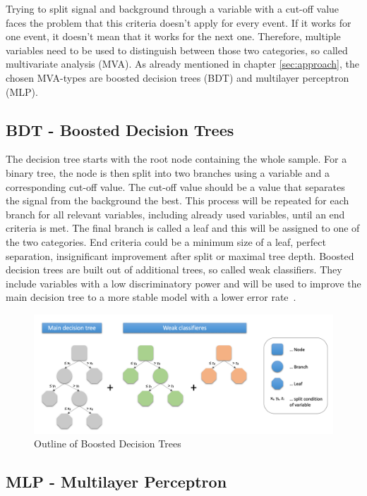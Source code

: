 \documentclass[11pt]{scrartcl}
\begin{document}
Trying to split signal and background through a variable with a cut-off value faces the problem that this criteria doesn't apply for every event. If it works for one event, it doesn't mean that it works for the next one. Therefore, multiple variables need to be used to distinguish between those two categories, so called multivariate analysis (MVA). As already mentioned in chapter \ref{sec:approach}, the chosen MVA-types are boosted decision trees (BDT) and multilayer perceptron (MLP).

	\subsection{BDT - Boosted Decision Trees}
	The decision tree starts with the root node containing the whole sample. For a binary tree, the node is then split into two branches using a variable and a corresponding cut-off value. The cut-off value should be a value that separates the signal from the background the best. This process will be repeated for each branch for all relevant variables, including already used variables, until an end criteria is met. The final branch is called a leaf and this will be assigned to one of the two categories. End criteria could be a minimum size of a leaf, perfect separation, insignificant improvement after split or maximal tree depth. Boosted decision trees are built out of additional trees, so called weak classifiers. They include variables with a low discriminatory power and will be used to improve the main decision tree to a more stable model with a lower error rate~\cite{BDT}. 

	\begin{figure}[H]
	\centering
	\includegraphics[width=1\textwidth]{figures/BDT.png}
	\caption{Outline of Boosted Decision Trees}
	\end{figure}
	
	\subsection{MLP - Multilayer Perceptron}
	
\end{document}
